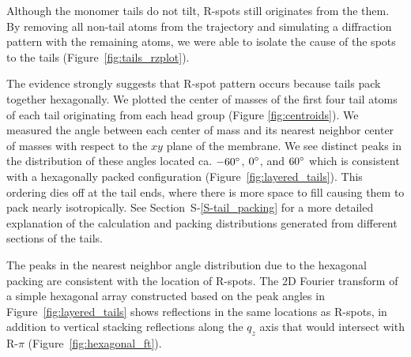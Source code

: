 \documentclass[journal=jpcbfk,manuscript=article]{achemso}
\begin{document}
  Although the monomer tails do not tilt, R-spots still originates from the 
  them. By removing all non-tail atoms from the trajectory and simulating a
  diffraction pattern with the remaining atoms, we were able to isolate the
  cause of the spots to the tails (Figure~\ref{fig:tails_rzplot}).

  The evidence strongly suggests that R-spot pattern occurs because tails pack 
  together hexagonally. We plotted the center of masses of the first four tail 
  atoms of each tail originating from each head group (Figure \ref{fig:centroids}).
  We measured the angle between each center of mass and its nearest neighbor 
  center of masses with respect to the $xy$ plane of the membrane. We see distinct
  peaks in the distribution of these angles located ca. $-60\degree$, $0\degree$,
  and $60\degree$ which is consistent with a hexagonally packed configuration 
  (Figure~\ref{fig:layered_tails}). 
This ordering dies off at the tail ends,
  where there is more space to fill causing them to pack nearly isotropically.
  See Section~S-\ref{S-tail_packing} for a more detailed explanation of the 
  calculation and packing distributions generated from different sections of
  the tails.

  The peaks in the nearest neighbor angle distribution due to the hexagonal packing are consistent with the
  location of R-spots. The 2D Fourier transform of a simple hexagonal array 
  constructed based on the peak angles in Figure~\ref{fig:layered_tails}
  shows reflections in the same locations as R-spots, in addition to vertical 
  stacking reflections along the $q_z$ axis that would intersect with R-$\pi$
  (Figure~\ref{fig:hexagonal_ft}). 

\end{document}
